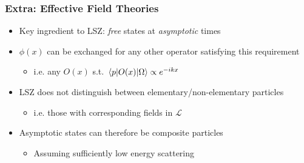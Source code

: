 \documentclass{beamer}
\begin{document}
\begin{frame}
\frametitle{Extra: Effective Field Theories}
\begin{itemize}
    \item<2-> Key ingredient to LSZ: \textit{free} states at \textit{asymptotic} times
    \item<3-> $\phi(x)$ can be exchanged for any other operator satisfying this requirement
    \begin{itemize}
        \item<4-> i.e. any $O(x)$ s.t. $\mel{p}{O(x)}{\Omega} \propto e^{-ikx}$
    \end{itemize}
    \item<5-> LSZ does not distinguish between elementary/non-elementary particles
    \begin{itemize}
        \item<6-> i.e. those with corresponding fields in $\mathscr{L}$
    \end{itemize}
    \item<7-> Asymptotic states can therefore be composite particles
    \begin{itemize}
        \item<8-> Assuming sufficiently low energy scattering
    \end{itemize}
\end{itemize}
\end{frame}
\end{document}
